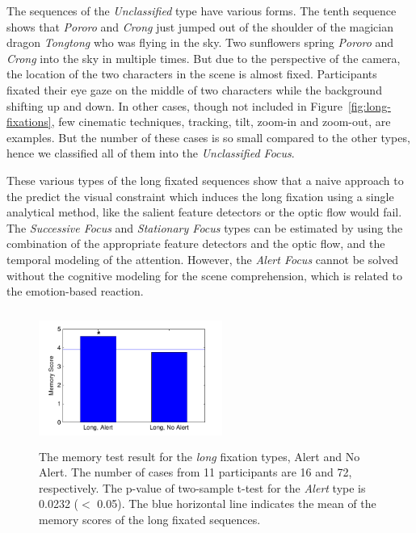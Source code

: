 \documentclass[10pt,letterpaper]{article}
\begin{document}
The sequences of the \textit{Unclassified} type have various forms. The tenth sequence shows that \textit{Pororo} and \textit{Crong} just jumped out of the shoulder of the magician dragon \textit{Tongtong} who was flying in the sky. Two sunflowers spring \textit{Pororo} and \textit{Crong} into the sky in multiple times. But due to the perspective of the camera, the location of the two characters in the scene is almost fixed. Participants fixated their eye gaze on the middle of two characters while the background shifting up and down. In other cases, though not included in Figure~\ref{fig:long-fixations}, few cinematic techniques, tracking, tilt, zoom-in and zoom-out, are examples. But the number of these cases is so small compared to the other types, hence we classified all of them into the \textit{Unclassified Focus}.

These various types of the long fixated sequences show that a naive approach to the predict the visual constraint which induces the long fixation using a single analytical method, like the salient feature detectors \cite{marr1980,canny1986} or the optic flow \cite{koenderink1986} would fail. The \textit{Successive Focus} and \textit{Stationary Focus} types can be estimated by using the combination of the appropriate feature detectors and the optic flow, and the temporal modeling of the attention. However, the \textit{Alert Focus} cannot be solved without the cognitive modeling for the scene comprehension, which is related to the emotion-based reaction. 

\begin{figure}
  \centerline{\includegraphics[width=60mm,height=44mm,trim=9mm 3mm 12mm 3mm]{./eps/memtest_long.pdf}}
  \caption{The memory test result for the \textit{long} fixation types, Alert and No Alert. The number of cases from 11 participants are 16 and 72, respectively. The p-value of two-sample t-test for the \textit{Alert} type is 0.0232 ($<$ 0.05). The blue horizontal line indicates the mean of the memory scores of the long fixated sequences.}
  \label{fig:memtest-long}
\end{figure}
\end{document}
